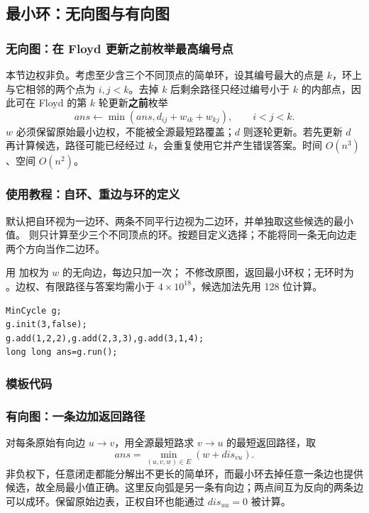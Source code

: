\subsection{最小环：无向图与有向图}
\label{algo:min-cycle}
\subsubsection*{无向图：在 Floyd 更新之前枚举最高编号点}
本节边权非负。考虑至少含三个不同顶点的简单环，设其编号最大的点是 $k$，环上与它相邻的两个点为 $i,j<k$。去掉 $k$ 后剩余路径只经过编号小于 $k$ 的内部点，因此可在 Floyd 的第 $k$ 轮更新\textbf{之前}枚举
\[
    ans\gets\min(ans,d_{ij}+w_{ik}+w_{kj}),\qquad i<j<k.
\]
$w$ 必须保留原始最小边权，不能被全源最短路覆盖；$d$ 则逐轮更新。若先更新 $d$ 再计算候选，路径可能已经经过 $k$，会重复使用它并产生错误答案。时间 $O(n^3)$、空间 $O(n^2)$。

\subsubsection*{使用教程：自环、重边与环的定义}
 默认把自环视为一边环、两条不同平行边视为二边环，并单独取这些候选的最小值。 则只计算至少三个不同顶点的环。按题目定义选择；不能将同一条无向边走两个方向当作二边环。

用  加权为 $w$ 的无向边，每边只加一次； 不修改原图，返回最小环权；无环时为 。边权、有限路径与答案均需小于 $4\times10^{18}$，候选加法先用 128 位计算。
\begin{lstlisting}[style=mtycpp,numbers=none]
MinCycle g;
g.init(3,false);
g.add(1,2,2),g.add(2,3,3),g.add(3,1,4);
long long ans=g.run();
\end{lstlisting}

\subsubsection*{模板代码}

\subsubsection*{有向图：一条边加返回路径}
对每条原始有向边 $u\to v$，用全源最短路求 $v\to u$ 的最短返回路径，取
\[
    ans=\min_{(u,v,w)\in E}(w+dis_{vu}).
\]
非负权下，任意闭走都能分解出不更长的简单环，而最小环去掉任意一条边也提供候选，故全局最小值正确。这里反向弧是另一条有向边；两点间互为反向的两条边可以成环。保留原始边表，正权自环也能通过 $dis_{uu}=0$ 被计算。

